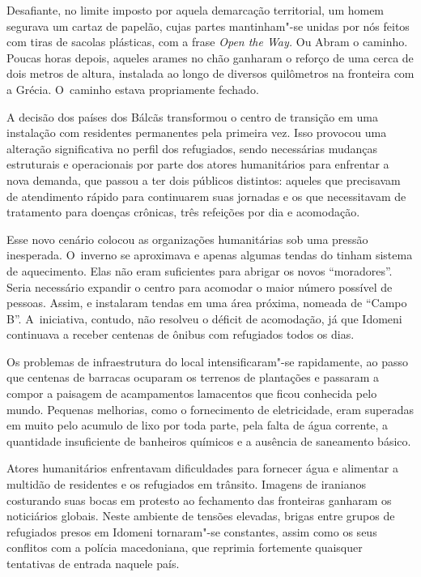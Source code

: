 
Desafiante, no limite imposto por aquela demarcação territorial, um
homem segurava um cartaz de papelão, cujas partes mantinham"-se unidas
por nós feitos com tiras de sacolas plásticas, com a frase \emph{Open the Way.} Ou Abram o caminho.
Poucas horas depois, aqueles arames no chão ganharam o reforço de uma
cerca de dois metros de altura, instalada ao longo de diversos quilômetros na
fronteira com a Grécia. O~caminho estava propriamente fechado.

A decisão dos países dos Bálcãs transformou o centro de transição em uma
instalação com residentes permanentes pela primeira vez. Isso provocou
uma alteração significativa no perfil dos refugiados, sendo necessárias
mudanças estruturais e operacionais por parte dos atores humanitários
para enfrentar a nova demanda, que passou a ter dois públicos distintos:
aqueles que precisavam de atendimento rápido para continuarem suas
jornadas e os que necessitavam de tratamento para doenças crônicas,
três refeições por dia e acomodação.

Esse novo cenário colocou as organizações humanitárias sob uma pressão
inesperada. O~inverno se aproximava e apenas algumas tendas do 
tinham sistema de aquecimento. Elas não eram suficientes para abrigar os
novos ``moradores''. Seria necessário expandir o centro para acomodar o
maior número possível de pessoas. Assim,  e  instalaram tendas
em uma área próxima, nomeada de ``Campo B''. A~iniciativa, contudo, não
resolveu o déficit de acomodação, já que Idomeni continuava a receber
centenas de ônibus com refugiados todos os dias.

Os problemas de infraestrutura do local intensificaram"-se rapidamente,
ao passo que centenas de barracas ocuparam os terrenos de plantações e
passaram a compor a paisagem de acampamentos lamacentos que ficou
conhecida pelo mundo. Pequenas melhorias, como o fornecimento de
eletricidade, eram superadas em muito pelo acumulo de lixo por toda
parte, pela falta de água corrente, a quantidade insuficiente de banheiros
químicos e a ausência de saneamento básico.

Atores humanitários enfrentavam dificuldades para fornecer água e
alimentar a multidão de residentes e os refugiados em trânsito. Imagens
de iranianos costurando suas bocas em protesto ao fechamento das
fronteiras ganharam os noticiários globais. Neste ambiente de tensões
elevadas, brigas entre grupos de refugiados presos em Idomeni
tornaram"-se constantes, assim como os seus conflitos com a polícia
macedoniana, que reprimia fortemente quaisquer tentativas de entrada
naquele país.

